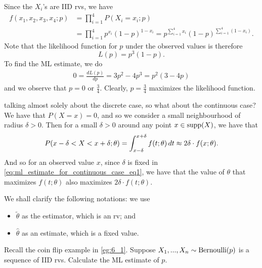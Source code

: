 \documentclass[notoc,notitlepage]{tufte-book}
\begin{document}
\begin{solution}
  Since the $X_i$'s are IID rvs, we have
  \begin{align*}
    f(x_1, x_2, x_3, x_4 ; p) &= \prod_{i=1}^{4} P(X_i = x_i ; p) \\
                              &= \prod_{i=1}^{4} p^{x_i} (1 - p)^{1 - x_i} = p^{\sum_{i=1}^{4} x_i} (1 - p)^{\sum_{i=1}^{4} ( 1 - x_i )}.
  \end{align*}
  Note that the likelihood function for $p$ under the observed values is therefore
  \begin{equation*}
    L(p) = p^3 (1 - p).
  \end{equation*}
  To find the ML estimate, we do
  \begin{align}
    0 = \frac{dL(p)}{dp} = 3p^2 - 4p^3 = p^2( 3 - 4p )
  \end{align}
  and we observe that $p = 0$ or $\frac{3}{4}$. Clearly, $p = \frac{3}{4}$ maximizes the likelihood function.
\end{solution}

\begin{note}
   talking almost solely about the discrete case, so what about the continuous case? We have that $P(X = x) = 0$, and so we consider a small neighbourhood of radius $\delta > 0$. Then for a small $\delta > 0$ around any point $x \in \operatorname{supp}(X)$, we have that
  \begin{equation}\label{eq:ml_estimate_for_continuous_case_eq1}
    P( x - \delta < X < x + \delta; \theta ) = \int_{x - \delta}^{x + \delta} f(t; \theta) \mathop{}\!d{t} \approx 2 \delta \cdot f(x; \theta).
  \end{equation}
  And so for an observed value $x$, since $\delta$ is fixed in \cref{eq:ml_estimate_for_continuous_case_eq1}, we have that the value of $\theta$ that maximizes $f(t; \theta)$ also maximizes $2 \delta \cdot f(t ; \theta)$.
\end{note}

\begin{warning}
  We shall clarify the following notations: we use
  \begin{itemize}
    \item $\tilde{\theta}$ as the estimator, which is an rv; and
    \item $\hat{\theta}$ as an estimate, which is a fixed value.
  \end{itemize}
\end{warning}

\begin{eg}\label{eg:6_2}
  Recall the coin flip example in \cref{eg:6_1}. Suppose $X_1, ..., X_n \sim \operatorname{Bernoulli}(p)$ is a sequence of IID rvs. Calculate the ML estimate of $p$.
\end{eg}
\end{document}
